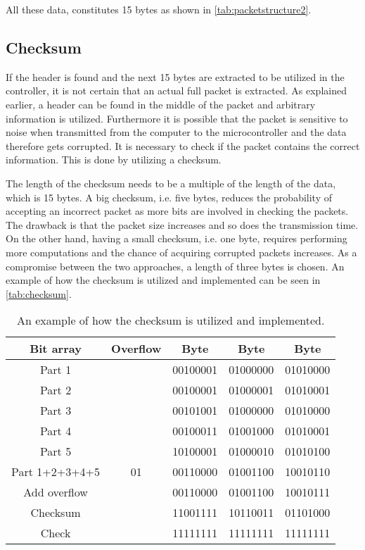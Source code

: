 All these data, constitutes 15 bytes as shown in \autoref{tab:packetstructure2}.


\subsection{Checksum}
If the header is found and the next 15 bytes are extracted to be utilized in the controller, it is not certain that an actual full packet is extracted. As explained earlier, a header can be found in the middle of the packet and arbitrary information is utilized. Furthermore it is possible that the packet is sensitive to noise when transmitted from the computer to the microcontroller and the data therefore gets corrupted. It is necessary to check if the packet contains the correct information. This is done by utilizing a checksum. 

The length of the checksum needs to be a multiple of the length of the data, which is 15 bytes. A big checksum, i.e. five bytes, reduces the probability of accepting an incorrect packet as more bits are involved in checking the packets. The drawback is that the packet size increases and so does the transmission time. On the other hand, having a small checksum, i.e. one byte, requires performing more computations and the chance of acquiring corrupted packets increases. As a compromise between the two approaches, a length of three bytes is chosen. An example of how the checksum is utilized and implemented can be seen in \autoref{tab:checksum}.  

\begin{table}[H]
    \centering
    \begin{tabular}{|c|c|c|c|c|}
        \hline
        Bit array      & Overflow   & Byte 	   & Byte 	  & Byte		 \\ \hline
        Part 1         & 		    & 00100001 & 01000000 & 01010000    \\ \hline
        Part 2         & 		    & 00100001 & 01000001 & 01010001    \\ \hline
        Part 3         & 		    & 00101001 & 01000000 & 01010000    \\ \hline
        Part 4         & 		    & 00100011 & 01001000 & 01010001    \\ \hline
        Part 5         & 		    & 10100001 & 01000010 & 01010100    \\ \hline
        Part 1+2+3+4+5 & 01	        & 00110000 & 01001100 & 10010110 	 \\ \hline
        Add overflow   & 		    & 00110000 & 01001100 & 10010111    \\ \hline
        Checksum       & 		    & 11001111 & 10110011 & 01101000    \\ \hline
        Check          & 		    & 11111111 & 11111111 & 11111111    \\ \hline
    \end{tabular}
    \caption{An example of how the checksum is utilized and implemented.}
    \label{tab:checksum}
\end{table}

